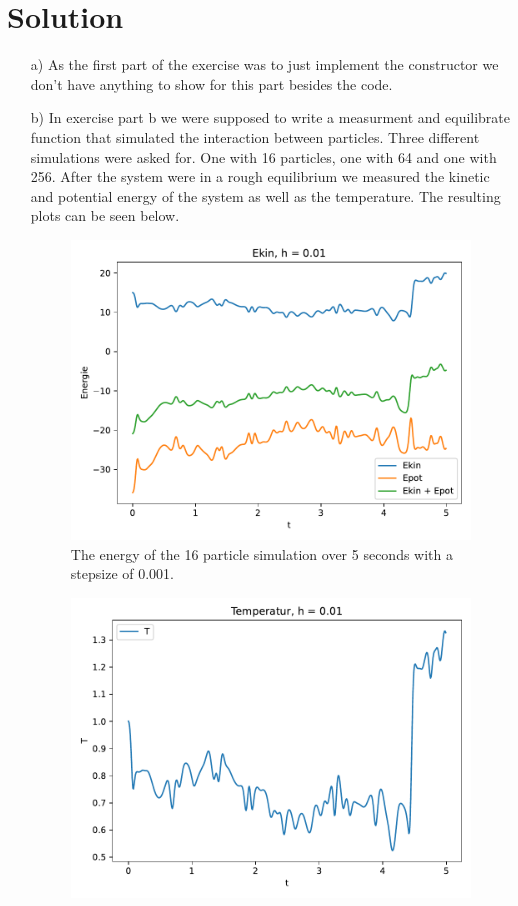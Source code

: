 
\section{Solution}
\label{sec:auswertung}

\begin{itemize}
    \item[a)]
        As the first part of the exercise was to just implement the constructor we don't have anything to show for this part besides the code.
    \item[b)]
        In exercise part b we were supposed to write a measurment and equilibrate function that simulated the interaction between particles.
        Three different simulations were asked for.
        One with 16 particles, one with 64 and one with 256.
        After the system were in a rough equilibrium we measured the kinetic and potential energy of the system as well as the temperature.
        The resulting plots can be seen below.
        \FloatBarrier
        \begin{figure}
            \includegraphics[width=\textwidth]{images/plot_E_16.pdf}
            \caption{The energy of the 16 particle simulation over 5 seconds with a stepsize of 0.001.}
        \end{figure}
        \begin{figure}
            \includegraphics[width=\textwidth]{images/plot_T_16.pdf}

\end{figure}
\end{itemize}
